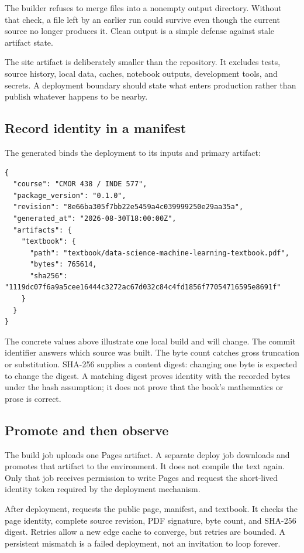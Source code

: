 The builder refuses to merge files into a nonempty output directory. Without
that check, a file left by an earlier run could survive even though the current
source no longer produces it. Clean output is a simple defense against stale
artifact state.

The site artifact is deliberately smaller than the repository. It excludes
tests, source history, local data, caches, notebook outputs, development tools,
and secrets. A deployment boundary should state what enters production rather
than publish whatever happens to be nearby.

\subsection{Record identity in a manifest}

The generated  binds the deployment to its inputs and
primary artifact:

\begin{lstlisting}[numbers=none]
{
  "course": "CMOR 438 / INDE 577",
  "package_version": "0.1.0",
  "revision": "8e66ba305f7bb22e5459a4c039999250e29aa35a",
  "generated_at": "2026-08-30T18:00:00Z",
  "artifacts": {
    "textbook": {
      "path": "textbook/data-science-machine-learning-textbook.pdf",
      "bytes": 765614,
      "sha256": "1119dc07f6a9a5cee16444c3272ac67d032c84c4fd1856f77054716595e8691f"
    }
  }
}
\end{lstlisting}

The concrete values above illustrate one local build and will change. The
commit identifier answers which source was built. The byte count catches gross
truncation or substitution. SHA-256 supplies a content digest: changing one
byte is expected to change the digest. A matching digest proves identity with
the recorded bytes under the hash assumption; it does not prove that the book's
mathematics or prose is correct.

\subsection{Promote and then observe}

The build job uploads one Pages artifact. A separate deploy job downloads and
promotes that artifact to the  environment. It does not
compile the text again. Only that job receives permission to write Pages and
request the short-lived identity token required by the deployment mechanism.

After deployment,  requests the
public page, manifest, and textbook. It checks the page identity, complete
source revision, PDF signature, byte count, and SHA-256 digest. Retries allow a
new edge cache to converge, but retries are bounded. A persistent mismatch is a
failed deployment, not an invitation to loop forever.

